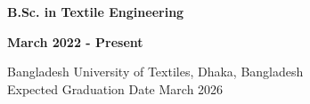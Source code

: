 \noindent
\begin{minipage}[t]{0.50\textwidth}
    \raggedright
    {\fontsize{12pt}{15pt}\bfseries B.Sc. in Textile Engineering}
\end{minipage}%
\hfill
\begin{minipage}[t]{0.50\textwidth}
    \raggedleft
    {\fontsize{12pt}{15pt}\bfseries March 2022 - Present}
\end{minipage}
Bangladesh University of Textiles, Dhaka, Bangladesh\\
Expected Graduation Date March 2026\\
\vspace{0.3em}

